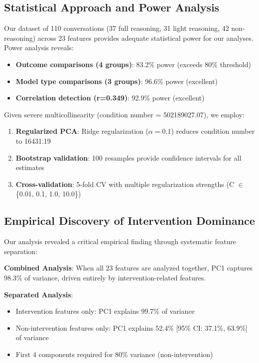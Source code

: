\documentclass[11pt,letterpaper]{article}
\newcommand{\totalConversations}{110}
\newcommand{\fullReasoningCount}{37}
\newcommand{\lightReasoningCount}{31}
\newcommand{\nonReasoningCount}{42}
\newcommand{\featureCount}{23}
\newcommand{\powerOutcomeGroups}{83.2\%}
\newcommand{\powerModelTypes}{96.6\%}
\newcommand{\powerCorrelation}{92.9\%}
\newcommand{\conditionNumber}{502189027.07}  %
\newcommand{\regularizedConditionNumber}{16431.19}
\newcommand{\regularizationAlpha}{0.1}
\newcommand{\allFeaturesPCOne}{98.3\%}  %
\newcommand{\interventionPCOneVariance}{99.7\%}
\newcommand{\nonInterventionPCOneVariance}{52.4\%}  %
\newcommand{\nonInterventionPCOneCILower}{37.1\%}
\newcommand{\nonInterventionPCOneCIUpper}{63.9\%}
\newcommand{\bootstrapSamples}{100}
\begin{document}
\subsection{Statistical Approach and Power Analysis}

Our dataset of \totalConversations{} conversations (\fullReasoningCount{} full reasoning, \lightReasoningCount{} light reasoning, \nonReasoningCount{} non-reasoning) across \featureCount{} features provides adequate statistical power for our analyses. Power analysis reveals:

\begin{itemize}
    \item \textbf{Outcome comparisons (4 groups)}: \powerOutcomeGroups{} power (exceeds 80\% threshold)
    \item \textbf{Model type comparisons (3 groups)}: \powerModelTypes{} power (excellent)
    \item \textbf{Correlation detection (r=0.349)}: \powerCorrelation{} power (excellent)
\end{itemize}

Given severe multicollinearity (condition number = \conditionNumber{}), we employ:

\begin{enumerate}
    \item \textbf{Regularized PCA}: Ridge regularization ($\alpha = \regularizationAlpha{}$) reduces condition number to \regularizedConditionNumber{}
    \item \textbf{Bootstrap validation}: \bootstrapSamples{} resamples provide confidence intervals for all estimates
    \item \textbf{Cross-validation}: 5-fold CV with multiple regularization strengths (C $\in$ \{0.01, 0.1, 1.0, 10.0\})
\end{enumerate}

\subsection{Empirical Discovery of Intervention Dominance}

Our analysis revealed a critical empirical finding through systematic feature separation:

\textbf{Combined Analysis}: When all 23 features are analyzed together, PC1 captures \allFeaturesPCOne{} of variance, driven entirely by intervention-related features.

\textbf{Separated Analysis}:
\begin{itemize}
    \item Intervention features only: PC1 explains \interventionPCOneVariance{} of variance
    \item Non-intervention features only: PC1 explains \nonInterventionPCOneVariance{} [95\% CI: \nonInterventionPCOneCILower{}, \nonInterventionPCOneCIUpper{}] of variance
    \item First 4 components required for 80\% variance (non-intervention)
\end{itemize}
\end{document}
